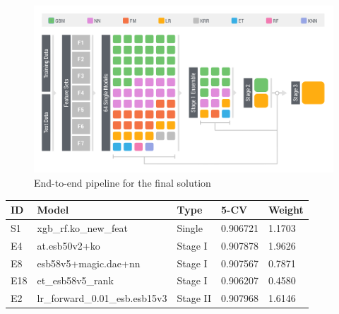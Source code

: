 \begin{figure}[!t]
  \caption{End-to-end pipeline for the final solution}
  \centering
    \includegraphics[width=1 \textwidth]{ensemble}
\end{figure}

\begin{center}
\begin{tabular}{lllll}
\label{tb:finalEnsemble}
ID 	& Model 				& Type 	& 5-CV 		& Weight\\ \hline
S1 	& xgb\_rf.ko\_new\_feat 	& Single 	& 0.906721 	& 1.1703 \\
E4 	& at.esb50v2+ko 		& Stage I 	& 0.907878 	& 1.9626\\
E8 	& esb58v5+magic.dae+nn & Stage I & 0.907567	& 0.7871\\
E18	& et\_esb58v5\_rank		& Stage I	& 0.906207 	& 0.4580\\
E2	& lr\_forward\_0.01\_esb.esb15v3 & Stage II & 0.907968 & 1.6146\\
\end{tabular}
\end{center}

